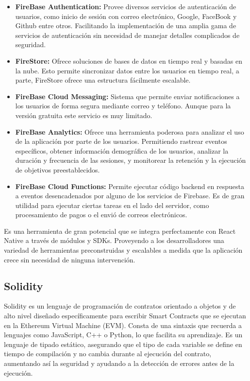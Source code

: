 \begin{itemize}

\item \textbf{FireBase Authentication:} Provee diversos servicios de autenticación de usuarios, como inicio de sesión con correo electrónico, Google, FaceBook y Github entre otros. Facilitando la implementación de una amplia gama de servicios de autenticación sin necesidad de manejar detalles complicados de seguridad.

\item \textbf{FireStore:} Ofrece soluciones de bases de datos en tiempo real y basadas en la nube. Esto permite sincronizar datos entre los usuarios en tiempo real, a parte, FireStore ofrece una estructura fácilmente escalable.

\item \textbf{FireBase Cloud Messaging:} Sistema que permite enviar notificaciones a los usuarios de forma segura mediante correo y teléfono. Aunque para la versión gratuita este servicio es muy limitado.

\item \textbf{FireBase Analytics:} Ofrece una herramienta poderosa para analizar el uso de la aplicación por parte de los usuarios.
Permitiendo rastrear eventos específicos, obtener información demográfica de los usuarios, analizar la duración y frecuencia de las sesiones, y monitorear la retención y la ejecución de objetivos preestablecidos.

\item \textbf{FireBase Cloud Functions:} Permite ejecutar código backend en respuesta a eventos desencadenados por alguno de los servicios de Firebase.
Es de gran utilidad para ejecutar ciertas tareas en el lado del servidor, como procesamiento de pagos o el envió de correos electrónicos. 

\end{itemize}

Es una herramienta de gran potencial que se integra perfectamente con React Native a través de módulos y SDKs.
Proveyendo a los desarrolladores una variedad de herramientas preconstruidas y escalables a medida que la aplicación crece sin necesidad de ninguna intervención.


\subsection{Solidity}

Solidity es un lenguaje de programación de contratos orientado a objetos y de alto nivel diseñado específicamente para escribir Smart Contracts que se ejecutan en la Ethereum Virtual Machine (EVM). Consta de una sintaxis que recuerda a lenguajes como JavaScript, C++ o Python, lo que facilita su aprendizaje. 
Es un lenguaje de tipado estático, asegurando que el tipo de cada variable se define en tiempo de compilación y no cambia durante al ejecución del contrato, aumentando así la seguridad y ayudando a la detección de errores antes de la ejecución.

